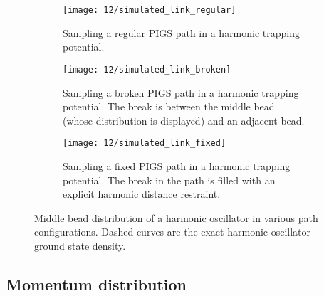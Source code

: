 \begin{figure}
	\centering
	\begin{subfigure}[b]{\textwidth}
		\texttt{[image: 12/simulated\_link\_regular]}
		\caption{
			Sampling a regular PIGS path in a harmonic trapping potential.
		}
		\label{fig:simulated-link-regular}
	\end{subfigure}
	\begin{subfigure}[b]{\textwidth}
		\texttt{[image: 12/simulated\_link\_broken]}
		\caption{
			Sampling a broken PIGS path in a harmonic trapping potential.
			The break is between the middle bead (whose distribution is displayed) and an adjacent bead.
		}
		\label{fig:simulated-link-broken}
	\end{subfigure}
	\begin{subfigure}[b]{\textwidth}
		\texttt{[image: 12/simulated\_link\_fixed]}
		\caption{
			Sampling a fixed PIGS path in a harmonic trapping potential.
			The break in the path is filled with an explicit harmonic distance restraint.
		}
		\label{fig:simulated-link-fixed}
	\end{subfigure}
	\caption[
		Broken path middle bead distribution
	]{
		Middle bead distribution of a harmonic oscillator in various path configurations.
		Dashed curves are the exact harmonic oscillator ground state density.
	}
\end{figure}


\subsection{Momentum distribution}

